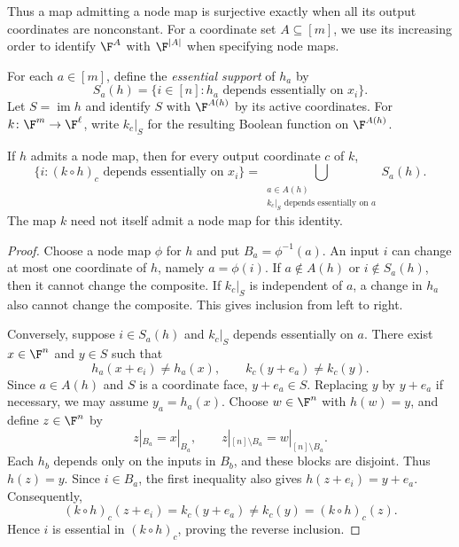 Thus a map admitting a node map is surjective exactly when all its output coordinates are nonconstant. For a coordinate set $A\subseteq[m]$, we use its increasing order to identify $\F^A$ with $\F^{|A|}$ when specifying node maps.

For each $a\in[m]$, define the \emph{essential support} of $h_a$ by
\[
    S_a(h)=\{i\in[n]:h_a\text{ depends essentially on }x_i\}.
\]
Let $S=\operatorname{im}h$ and identify $S$ with $\F^{A(h)}$ by its active coordinates. For $k\colon\F^m\to\F^\ell$, write $k_c|_S$ for the resulting Boolean function on $\F^{A(h)}$.

\begin{proposition}\label{prop:visible-composition-support}
If $h$ admits a node map, then for every output coordinate $c$ of $k$,
\begin{equation}\label{eq:visible-composition-support}
    \{i:(k\circ h)_c\text{ depends essentially on }x_i\}
    =\bigcup_{\substack{a\in A(h)\\ k_c|_S\text{ depends essentially on }a}}S_a(h).
\end{equation}
The map $k$ need not itself admit a node map for this identity.
\end{proposition}

\begin{proof}
Choose a node map $\phi$ for $h$ and put $B_a=\phi^{-1}(a)$. An input $i$ can change at most one coordinate of $h$, namely $a=\phi(i)$. If $a\notin A(h)$ or $i\notin S_a(h)$, then it cannot change the composite. If $k_c|_S$ is independent of $a$, a change in $h_a$ also cannot change the composite. This gives inclusion from left to right.

Conversely, suppose $i\in S_a(h)$ and $k_c|_S$ depends essentially on $a$. There exist $x\in\F^n$ and $y\in S$ such that
\[
    h_a(x+e_i)\ne h_a(x),
    \qquad k_c(y+e_a)\ne k_c(y).
\]
Since $a\in A(h)$ and $S$ is a coordinate face, $y+e_a\in S$. Replacing $y$ by $y+e_a$ if necessary, we may assume $y_a=h_a(x)$. Choose $w\in\F^n$ with $h(w)=y$, and define $z\in\F^n$ by
\[
    z|_{B_a}=x|_{B_a},
    \qquad z|_{[n]\setminus B_a}=w|_{[n]\setminus B_a}.
\]
Each $h_b$ depends only on the inputs in $B_b$, and these blocks are disjoint. Thus $h(z)=y$. Since $i\in B_a$, the first inequality also gives $h(z+e_i)=y+e_a$. Consequently,
\[
    (k\circ h)_c(z+e_i)=k_c(y+e_a)
    \ne k_c(y)=(k\circ h)_c(z).
\]
Hence $i$ is essential in $(k\circ h)_c$, proving the reverse inclusion.
\end{proof}

